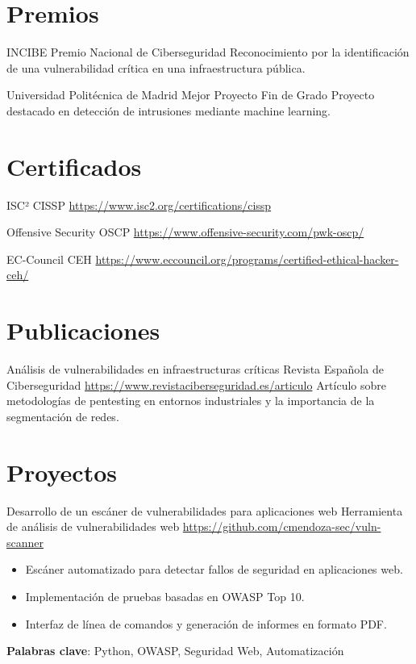 \documentclass[a4paper, serif, 10pt]{moderncv}
\begin{document}
\section{Premios}

        {INCIBE}
        {Premio Nacional de Ciberseguridad}
        {}
        {}
        {Reconocimiento por la identificación de una vulnerabilidad crítica en una infraestructura pública.}

        {Universidad Politécnica de Madrid}
        {Mejor Proyecto Fin de Grado}
        {}
        {}
        {Proyecto destacado en detección de intrusiones mediante machine learning.}
\section{Certificados}

        {ISC²}
        {CISSP}
        {\url{https://www.isc2.org/certifications/cissp}}
        {}
        {}

        {Offensive Security}
        {OSCP}
        {\url{https://www.offensive-security.com/pwk-oscp/}}
        {}
        {}

        {EC-Council}
        {CEH}
        {\url{https://www.eccouncil.org/programs/certified-ethical-hacker-ceh/}}
        {}
        {}
\section{Publicaciones}

        {Análisis de vulnerabilidades en infraestructuras críticas}
        {Revista Española de Ciberseguridad}
        {\url{https://www.revistaciberseguridad.es/articulo}}
        {}
        {Artículo sobre metodologías de pentesting en entornos industriales y la importancia de la segmentación de redes.}
\section{Proyectos}

        {Desarrollo de un escáner de vulnerabilidades para aplicaciones web}
        {Herramienta de análisis de vulnerabilidades web}
        {\url{https://github.com/cmendoza-sec/vuln-scanner}}
        {}
        {\begin{itemize}
\item Escáner automatizado para detectar fallos de seguridad en aplicaciones web.
\item Implementación de pruebas basadas en OWASP Top 10.
\item Interfaz de línea de comandos y generación de informes en formato PDF.
\end{itemize}
\textbf{Palabras clave}: Python, OWASP, Seguridad Web, Automatización}
\end{document}
